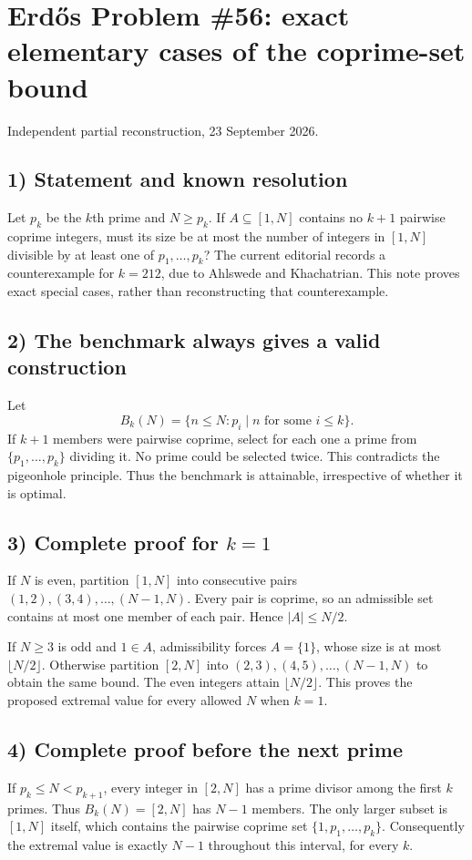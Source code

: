 \section{Erd\H{o}s Problem \#56: exact elementary cases of the coprime-set bound}
\noindent Independent partial reconstruction, 23 September 2026.

\subsection*{1) Statement and known resolution}
Let $p_k$ be the $k$th prime and $N\ge p_k$. If $A\subseteq[1,N]$ contains no $k+1$ pairwise coprime integers, must its size be at most the number of integers in $[1,N]$ divisible by at least one of $p_1,\ldots,p_k$? The current editorial records a counterexample for $k=212$, due to Ahlswede and Khachatrian. This note proves exact special cases, rather than reconstructing that counterexample.

\subsection*{2) The benchmark always gives a valid construction}
Let
\[
 B_k(N)=\{n\le N:p_i\mid n\text{ for some }i\le k\}.
\]
If $k+1$ members were pairwise coprime, select for each one a prime from $\{p_1,\ldots,p_k\}$ dividing it. No prime could be selected twice. This contradicts the pigeonhole principle. Thus the benchmark is attainable, irrespective of whether it is optimal.

\subsection*{3) Complete proof for $k=1$}
If $N$ is even, partition $[1,N]$ into consecutive pairs $(1,2),(3,4),\ldots,(N-1,N)$. Every pair is coprime, so an admissible set contains at most one member of each pair. Hence $|A|\le N/2$.

If $N\ge3$ is odd and $1\in A$, admissibility forces $A=\{1\}$, whose size is at most $\lfloor N/2\rfloor$. Otherwise partition $[2,N]$ into $(2,3),(4,5),\ldots,(N-1,N)$ to obtain the same bound. The even integers attain $\lfloor N/2\rfloor$. This proves the proposed extremal value for every allowed $N$ when $k=1$.

\subsection*{4) Complete proof before the next prime}
If $p_k\le N<p_{k+1}$, every integer in $[2,N]$ has a prime divisor among the first $k$ primes. Thus $B_k(N)=[2,N]$ has $N-1$ members. The only larger subset is $[1,N]$ itself, which contains the pairwise coprime set $\{1,p_1,\ldots,p_k\}$. Consequently the extremal value is exactly $N-1$ throughout this interval, for every $k$.

